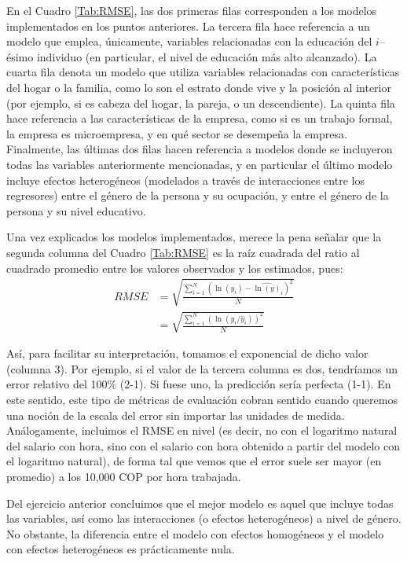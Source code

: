 En el Cuadro \ref{Tab:RMSE}, las dos primeras filas corresponden a los modelos implementados en los puntos anteriores. La tercera fila hace referencia a un modelo que emplea, únicamente, variables relacionadas con la educación del $i$--ésimo individuo (en particular, el nivel de educación más alto alcanzado). La cuarta fila denota un modelo que utiliza variables relacionadas con características del hogar o la familia, como lo son el estrato donde vive y la posición al interior (por ejemplo, si es cabeza del hogar, la pareja, o un descendiente). La quinta fila hace referencia a las características de la empresa, como si es un trabajo formal, la empresa es microempresa, y en qué sector se desempeña la empresa. Finalmente, las últimas dos filas hacen referencia a modelos donde se incluyeron todas las variables anteriormente mencionadas, y en particular el último modelo incluye efectos heterogéneos (modelados a través de interacciones entre los regresores) entre el género de la persona y su ocupación, y entre el género de la persona y su nivel educativo.  

Una vez explicados los modelos implementados, merece la pena señalar que la segunda columna del Cuadro \ref{Tab:RMSE} es la raíz cuadrada del ratio al cuadrado promedio entre los valores observados y los estimados, pues:
\begin{align}
    RMSE & = \sqrt{\frac{\sum_{i=1}^{N} (\ln (y_{i}) - \hat{\ln (y)}_{i})^{2}}{N}} \nonumber \\
    & = \sqrt{\frac{\sum_{i=1}^{N} (\ln (y_{i}/\hat{y}_{i}))^{2}}{N}} \nonumber
\end{align}

Así, para facilitar su interpretación, tomamos el exponencial de dicho valor (columna 3). Por ejemplo, si el valor de la tercera columna es dos, tendríamos un error relativo del 100\% (2-1). Si fuese uno, la predicción sería perfecta (1-1). En este sentido, este tipo de métricas de evaluación cobran sentido cuando queremos una noción de la escala del error sin importar las unidades de medida. Análogamente, incluimos el RMSE en nivel (es decir, no con el logaritmo natural del salario con hora, sino con el salario con hora obtenido a partir del modelo con el logaritmo natural), de forma tal que vemos que el error suele ser mayor (en promedio) a los 10,000 COP por hora trabajada.

Del ejercicio anterior concluimos que el mejor modelo es aquel que incluye todas las variables, así como las interacciones (o efectos heterogéneos) a nivel de género. No obstante, la diferencia entre el modelo con efectos homogéneos y el modelo con efectos heterogéneos es prácticamente nula.

